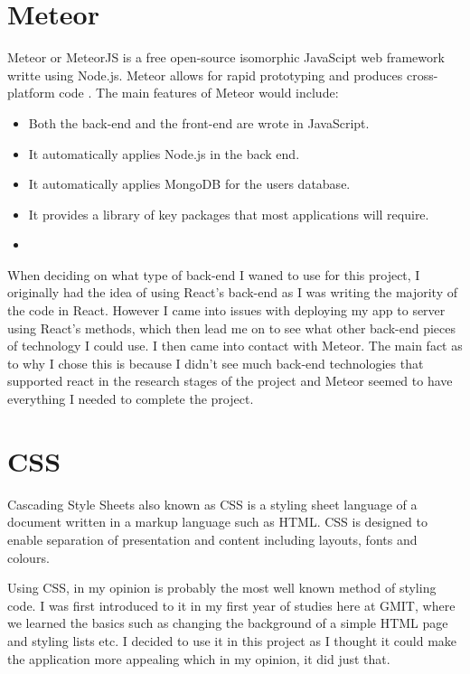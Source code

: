 \section{Meteor}
Meteor or MeteorJS is a free open-source isomorphic JavaScipt web framework writte using Node.js. Meteor allows for rapid prototyping and produces cross-platform code \cite{Meteor}.
The main features of Meteor would include:

\begin{itemize}
    \item Both the back-end and the front-end are wrote in JavaScript.
    \item It automatically applies Node.js in the back end.
    \item It automatically applies MongoDB for the users database.
    \item It provides a library of key packages that most applications will require.
    \item 
\end{itemize}

When deciding on what type of back-end I waned to use for this project, I originally had the idea of using React's back-end as I was writing the majority of the code in React. However I came into issues with deploying my app to server using React's methods, which then lead me on to see what other back-end pieces of technology I could use. I then came into contact with Meteor. The main fact as to why I chose this is because I didn't see much back-end technologies that supported react in the research stages of the project and Meteor seemed to have everything I needed to complete the project.

\section{CSS}
Cascading Style Sheets also known as CSS is a styling sheet language of a document written in a markup language such as HTML. CSS is designed to enable separation of presentation and content including layouts, fonts and colours\cite{CSS}.

Using CSS, in my opinion is probably the most well known method of styling code. I was first introduced to it in my first year of studies here at GMIT, where we learned the basics such as changing the background of a simple HTML page and styling lists etc. I decided to use it in this project as I thought it could make the application more appealing which in my opinion, it did just that. 

